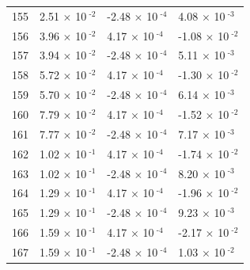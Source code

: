 \documentclass[a4paper,11pt]{article}
\begin{document}
\begin{center}
\begin{longtable}{|R{1.5cm}|R{2.5cm}|R{2.5cm}|R{2.5cm}|}
  155 &         2.51 $\times$ 10$^{\text{          -2}}$  &        -2.48 $\times$ 10$^{\text{          -4}}$  &         4.08 $\times$ 10$^{\text{          -3}}$ \\ 
  156 &         3.96 $\times$ 10$^{\text{          -2}}$  &         4.17 $\times$ 10$^{\text{          -4}}$  &        -1.08 $\times$ 10$^{\text{          -2}}$ \\ 
  157 &         3.94 $\times$ 10$^{\text{          -2}}$  &        -2.48 $\times$ 10$^{\text{          -4}}$  &         5.11 $\times$ 10$^{\text{          -3}}$ \\ 
  158 &         5.72 $\times$ 10$^{\text{          -2}}$  &         4.17 $\times$ 10$^{\text{          -4}}$  &        -1.30 $\times$ 10$^{\text{          -2}}$ \\ 
  159 &         5.70 $\times$ 10$^{\text{          -2}}$  &        -2.48 $\times$ 10$^{\text{          -4}}$  &         6.14 $\times$ 10$^{\text{          -3}}$ \\ 
  160 &         7.79 $\times$ 10$^{\text{          -2}}$  &         4.17 $\times$ 10$^{\text{          -4}}$  &        -1.52 $\times$ 10$^{\text{          -2}}$ \\ 
  161 &         7.77 $\times$ 10$^{\text{          -2}}$  &        -2.48 $\times$ 10$^{\text{          -4}}$  &         7.17 $\times$ 10$^{\text{          -3}}$ \\ 
  162 &         1.02 $\times$ 10$^{\text{          -1}}$  &         4.17 $\times$ 10$^{\text{          -4}}$  &        -1.74 $\times$ 10$^{\text{          -2}}$ \\ 
  163 &         1.02 $\times$ 10$^{\text{          -1}}$  &        -2.48 $\times$ 10$^{\text{          -4}}$  &         8.20 $\times$ 10$^{\text{          -3}}$ \\ 
  164 &         1.29 $\times$ 10$^{\text{          -1}}$  &         4.17 $\times$ 10$^{\text{          -4}}$  &        -1.96 $\times$ 10$^{\text{          -2}}$ \\ 
  165 &         1.29 $\times$ 10$^{\text{          -1}}$  &        -2.48 $\times$ 10$^{\text{          -4}}$  &         9.23 $\times$ 10$^{\text{          -3}}$ \\ 
  166 &         1.59 $\times$ 10$^{\text{          -1}}$  &         4.17 $\times$ 10$^{\text{          -4}}$  &        -2.17 $\times$ 10$^{\text{          -2}}$ \\ 
  167 &         1.59 $\times$ 10$^{\text{          -1}}$  &        -2.48 $\times$ 10$^{\text{          -4}}$  &         1.03 $\times$ 10$^{\text{          -2}}$ \\ 

\end{longtable}
\end{center}
\end{document}
